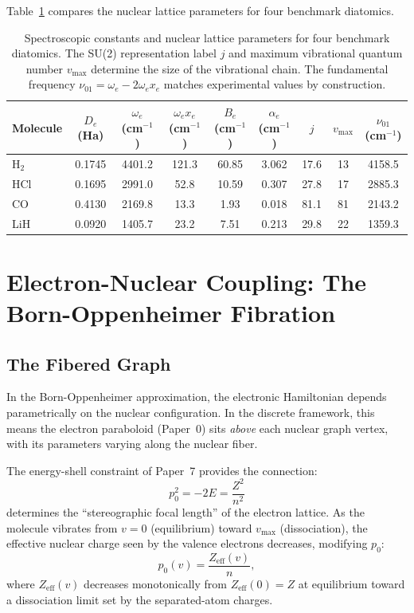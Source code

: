 \documentclass[aps,pra,twocolumn,superscriptaddress,longbibliography]{revtex4-2}
\begin{document}
Table~\ref{tab:molecules} compares the nuclear lattice parameters for
four benchmark diatomics.

\begin{table}
\centering
\begin{tabular}{lcccccccc}
\toprule
Molecule & $D_e$ (Ha) & $\omega_e$ (cm$^{-1}$) & $\omega_e x_e$ (cm$^{-1}$)
& $B_e$ (cm$^{-1}$) & $\alpha_e$ (cm$^{-1}$) & $j$ & $v_{\max}$ &
$\nu_{01}$ (cm$^{-1}$) \\
\midrule
H$_2$  & 0.1745 & 4401.2 & 121.3 & 60.85 & 3.062 & 17.6 & 13 & 4158.5 \\
HCl    & 0.1695 & 2991.0 &  52.8 & 10.59 & 0.307 & 27.8 & 17 & 2885.3 \\
CO     & 0.4130 & 2169.8 &  13.3 &  1.93 & 0.018 & 81.1 & 81 & 2143.2 \\
LiH    & 0.0920 & 1405.7 &  23.2 &  7.51 & 0.213 & 29.8 & 22 & 1359.3 \\
\bottomrule
\end{tabular}
\caption{Spectroscopic constants and nuclear lattice parameters for four
benchmark diatomics.  The SU(2) representation label $j$ and maximum
vibrational quantum number $v_{\max}$ determine the size of the
vibrational chain.  The fundamental frequency
$\nu_{01} = \omega_e - 2\omega_e x_e$ matches experimental values by
construction.}
\label{tab:molecules}
\end{table}


\section{Electron-Nuclear Coupling: The Born-Oppenheimer Fibration}
\label{sec:coupling}

\subsection{The Fibered Graph}

In the Born-Oppenheimer approximation, the electronic Hamiltonian
depends parametrically on the nuclear configuration.  In the discrete
framework, this means the electron paraboloid (Paper~0) sits
\emph{above} each nuclear graph vertex, with its parameters varying
along the nuclear fiber.

The energy-shell constraint of Paper~7 provides the connection:
\begin{equation}
p_0^2 = -2E = \frac{Z^2}{n^2}
\label{eq:p0}
\end{equation}
determines the ``stereographic focal length'' of the electron lattice.
As the molecule vibrates from $v = 0$ (equilibrium) toward $v_{\max}$
(dissociation), the effective nuclear charge seen by the valence
electrons decreases, modifying $p_0$:
\begin{equation}
p_0(v) = \frac{Z_{\mathrm{eff}}(v)}{n},
\label{eq:p0v}
\end{equation}
where $Z_{\mathrm{eff}}(v)$ decreases monotonically from
$Z_{\mathrm{eff}}(0) = Z$ at equilibrium toward a dissociation limit
set by the separated-atom charges.
\end{document}
